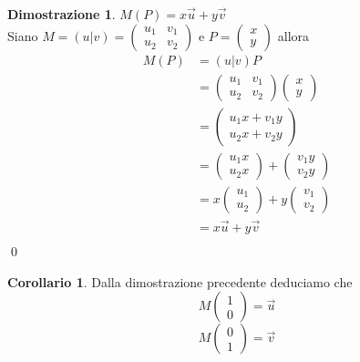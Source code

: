 \documentclass[10pt,a4paper]{article}
\theoremstyle{plain}
\theoremstyle{definition}
\newtheorem{dimostrazione}[subsection]{Dimostrazione}
\newtheorem{corollario}[subsection]{Corollario}
\begin{document}
	\begin{dimostrazione}$M(P)=x\vec{u}  + y \vec{v}$\\
Siano $M=(u\vert v)=
		\begin{pmatrix}
		u_1 & v_1 \\
		u_2 & v_2
		\end{pmatrix}$ e $P=\begin{pmatrix}
			x \\
			y
		\end{pmatrix}$ allora
		\begin{align*}
			M(P)&=(u\vert v)P \\
			&=\begin{pmatrix}
			u_1 & v_1 \\
			u_2 & v_2
			\end{pmatrix}
			\begin{pmatrix}
			x \\
			y
			\end{pmatrix}
			\\
			&=\begin{pmatrix}
			u_1x + v_1y \\
			u_2x + v_2y
			\end{pmatrix}
			\\
			&=\begin{pmatrix}
			u_1x \\
			u_2x
			\end{pmatrix}
			+
			\begin{pmatrix}
			v_1y \\
			v_2y
			\end{pmatrix}
			\\
			&=x\begin{pmatrix}
			u_1 \\
			u_2
			\end{pmatrix}
			+
			y\begin{pmatrix}
			v_1 \\
			v_2
			\end{pmatrix}
			\\
			&=x\vec{u}  + y \vec{v}
			\\
		\end{align*}
		\qed
	\end{dimostrazione}
	\begin{corollario}Dalla dimostrazione precedente deduciamo che
		\[
		M\begin{pmatrix}
		1 \\
		0
		\end{pmatrix}
		= \vec{u}
		\]
		\[
		M\begin{pmatrix}
		0 \\
		1
		\end{pmatrix}
		= \vec{v}
		\]
	\end{corollario}
\end{document}
